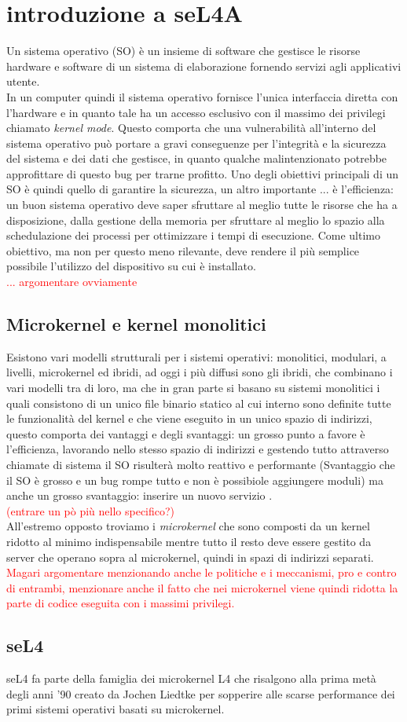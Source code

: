 \chapter{introduzione a seL4A}
Un sistema operativo (SO) è un insieme di software che gestisce le risorse hardware e software di un sistema di elaborazione fornendo servizi agli applicativi utente.\\
In un computer quindi il sistema operativo fornisce l'unica interfaccia diretta con l'hardware e in quanto tale ha un accesso esclusivo con il massimo dei privilegi chiamato \textit{kernel mode}. Questo comporta che una vulnerabilità all'interno del sistema operativo può portare a gravi conseguenze per l'integrità e la sicurezza del sistema e dei dati che gestisce, in quanto qualche malintenzionato potrebbe approfittare di questo bug per trarne profitto.
Uno degli obiettivi principali di un SO è quindi quello di garantire la sicurezza, un altro importante ... è l'efficienza: un buon sistema operativo deve saper sfruttare al meglio tutte le risorse che ha a disposizione, dalla gestione della memoria per sfruttare al meglio lo spazio alla schedulazione dei processi per ottimizzare i tempi di esecuzione. Come ultimo obiettivo, ma non per questo meno rilevante, deve rendere il più semplice possibile l'utilizzo del dispositivo su cui è installato.\\
\textcolor{red}{... argomentare ovviamente}

\section{Microkernel e kernel monolitici}
Esistono vari modelli strutturali per i sistemi operativi: monolitici, modulari, a livelli, microkernel ed ibridi, ad oggi i più diffusi sono gli ibridi, che combinano i vari modelli tra di loro, ma che in gran parte si basano su sistemi monolitici i quali consistono di un unico file binario statico al cui interno sono definite tutte le funzionalità del kernel e che viene eseguito in un unico spazio di indirizzi, questo comporta dei vantaggi e degli svantaggi: un grosso punto a favore è  l'efficienza, lavorando nello stesso spazio di indirizzi e gestendo tutto attraverso chiamate di sistema il SO risulterà molto reattivo e performante (Svantaggio che il SO è grosso e un bug rompe tutto e non è possibiole aggiungere moduli) ma anche un grosso svantaggio: inserire un nuovo servizio .\\
\textcolor{red}{(entrare un pò più nello specifico?)}\\
All'estremo opposto troviamo i \textit{microkernel} che sono composti da un kernel ridotto al minimo indispensabile mentre tutto il resto deve essere gestito da server che operano sopra al microkernel, quindi in spazi di indirizzi separati.\\
\textcolor{red}{Magari argomentare menzionando anche le politiche e i meccanismi, pro e contro di entrambi, menzionare anche il fatto che nei microkernel viene quindi ridotta la parte di codice eseguita con i massimi privilegi.}\\

\section{seL4}
seL4 fa parte della famiglia dei microkernel L4 che risalgono alla prima metà degli anni '90 creato da Jochen Liedtke per sopperire alle scarse performance dei primi sistemi operativi basati su microkernel.